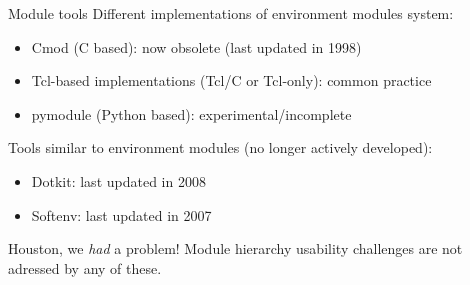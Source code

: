 \documentclass[10pt,xcolor={usenames,dvipsnames}]{beamer}
\begin{document}

\begin{frame}{Module tools}
Different implementations of environment modules system:
\begin{itemize}
    \item
        Cmod (C based): now obsolete (last updated in 1998)
    \item
        Tcl-based implementations (Tcl/C or Tcl-only): common practice
    \item
        pymodule (Python based): experimental/incomplete
\end{itemize}
Tools similar to environment modules (no longer actively developed):
\begin{itemize}
    \item
        Dotkit: last updated in 2008
    \item
        Softenv: last updated in 2007
\end{itemize}

\begin{center}
    \begin{minipage}{0.9\textwidth}
        \begin{alertblock}{\small Houston, we \emph{had} a problem!}
            \footnotesize
            Module hierarchy usability challenges are not adressed by any of these.
        \end{alertblock}
    \end{minipage}
\end{center}
\end{frame}

\end{document}
